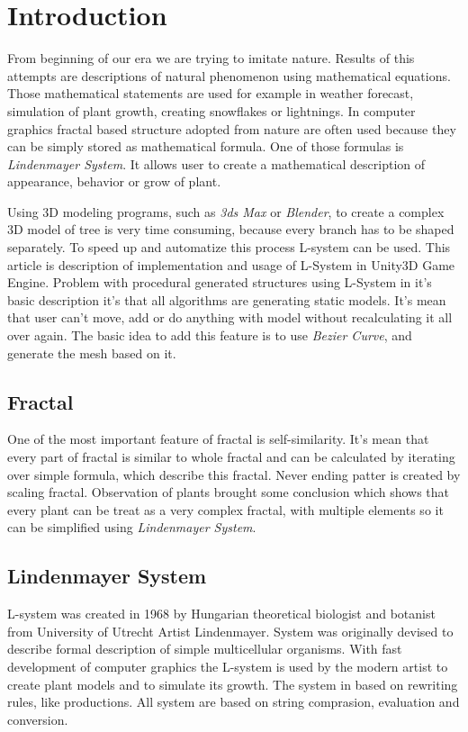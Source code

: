 \documentclass[b5paper,twoside,11pt]{article}
\begin{document}
\section{Introduction}
From beginning of our era we are trying to imitate nature. Results of this attempts are descriptions of natural phenomenon using mathematical equations. Those mathematical statements are used for example in weather forecast, simulation of plant growth, creating snowflakes or lightnings. In computer graphics fractal based structure adopted from nature are often used because they can be simply stored as mathematical formula. One of those formulas is \textit{Lindenmayer System}. It allows user to create a mathematical description of appearance, behavior or grow of plant. 
\par Using 3D modeling programs, such as \textit{3ds Max} or \textit{Blender}, to create a complex 3D model of tree is very time consuming, because every branch has to be shaped separately. To speed up and  automatize this process L-system can be used. This article is description of implementation and usage of L-System in Unity3D Game Engine. Problem with procedural generated structures using L-System in it's basic description it's that all algorithms are generating static models. It's mean that user can't move, add or do anything with model without recalculating it all over again. The basic idea to add this feature is to use \textit{Bezier Curve}, and generate the mesh based on it.
 
\subsection{Fractal}
One of the most important feature of fractal is self-similarity. It's mean that every part of fractal is similar to whole fractal and can be calculated by iterating over simple formula, which describe this fractal. Never ending patter is created by scaling fractal. Observation of plants brought some conclusion which shows that every plant can be treat as a very complex fractal, with multiple elements so it can be simplified using \textit{Lindenmayer System}.

\subsection{Lindenmayer System}
L-system was created in 1968 by Hungarian theoretical biologist and botanist from University of Utrecht Artist Lindenmayer. System was originally devised to describe formal description of simple multicellular organisms. With fast development of computer graphics the L-system is used by the modern artist to create plant models and to simulate its growth. The system in based on rewriting rules, like productions. All system are based on string comprasion, evaluation and conversion.
\end{document}

